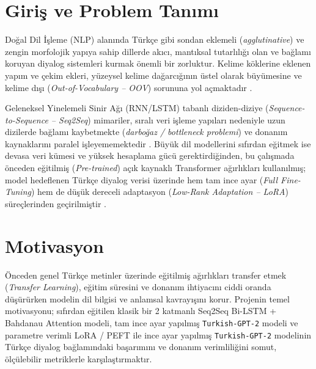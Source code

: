 \documentclass[conference]{IEEEtran}
\begin{document}
\section{Giriş ve Problem Tanımı}
Doğal Dil İşleme (NLP) alanında Türkçe gibi sondan eklemeli (\textit{agglutinative}) ve zengin morfolojik yapıya sahip dillerde akıcı, mantıksal tutarlılığı olan ve bağlamı koruyan diyalog sistemleri kurmak önemli bir zorluktur. Kelime köklerine eklenen yapım ve çekim ekleri, yüzeysel kelime dağarcığının üstel olarak büyümesine ve kelime dışı (\textit{Out-of-Vocabulary -- OOV}) sorununa yol açmaktadır \cite{sennrich2016}.

Geleneksel Yinelemeli Sinir Ağı (RNN/LSTM) tabanlı diziden-diziye (\textit{Sequence-to-Sequence -- Seq2Seq}) mimariler, sıralı veri işleme yapıları nedeniyle uzun dizilerde bağlamı kaybetmekte (\textit{darboğaz / bottleneck problemi}) ve donanım kaynaklarını paralel işleyememektedir \cite{bahdanau2014}. Büyük dil modellerini sıfırdan eğitmek ise devasa veri kümesi ve yüksek hesaplama gücü gerektirdiğinden, bu çalışmada önceden eğitilmiş (\textit{Pre-trained}) açık kaynaklı Transformer ağırlıkları kullanılmış; model hedeflenen Türkçe diyalog verisi üzerinde hem tam ince ayar (\textit{Full Fine-Tuning}) hem de düşük dereceli adaptasyon (\textit{Low-Rank Adaptation -- LoRA}) süreçlerinden geçirilmiştir \cite{vaswani2017, radford2019, hu2022lora}.

\section{Motivasyon}
Önceden genel Türkçe metinler üzerinde eğitilmiş ağırlıkları transfer etmek (\textit{Transfer Learning}), eğitim süresini ve donanım ihtiyacını ciddi oranda düşürürken modelin dil bilgisi ve anlamsal kavrayışını korur. Projenin temel motivasyonu; sıfırdan eğitilen klasik bir 2 katmanlı Seq2Seq Bi-LSTM + Bahdanau Attention modeli, tam ince ayar yapılmış \texttt{Turkish-GPT-2} modeli ve parametre verimli LoRA / PEFT ile ince ayar yapılmış \texttt{Turkish-GPT-2} modelinin Türkçe diyalog bağlamındaki başarımını ve donanım verimliliğini somut, ölçülebilir metriklerle karşılaştırmaktır.
\end{document}
